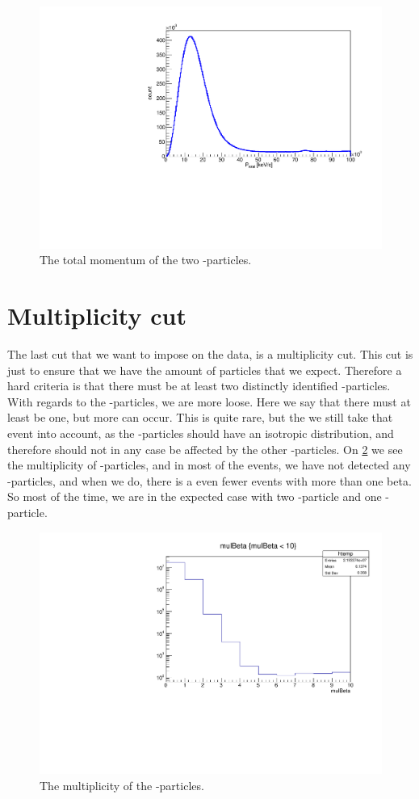 \begin{figure}[h]
	\centering
	\includegraphics[width=\linewidth]{../figures/ptotNoCut.pdf}
	\caption{The total momentum of the two \al-particles.}
	\label{fig:totalMomentum}
\end{figure}

\section{Multiplicity cut}
The last cut that we want to impose on the data, is a multiplicity cut. This cut is just to ensure that we have the amount of particles that we expect. 
Therefore a hard criteria is that there must be at least two distinctly identified \al-particles. \\

With regards to the \be-particles, we are more loose. Here we say that there must at least be one, but more can occur. This is quite rare, but the we still take that event into account, as the \be-particles should have an isotropic distribution, and therefore should not in any case be affected by the other \al-particles. On \cref{fig:mulBeta} we see the multiplicity of \be-particles, and in most of the events, we have not detected any \be-particles, and when we do, there is a even fewer events with more than one beta. So most of the time, we are in the expected case with two \al-particle and one \be-particle. 

\begin{figure}[h]
	\includegraphics[width=\linewidth]{../figures/mulBeta.pdf}
	\caption{The multiplicity of the \be-particles.}
	\label{fig:mulBeta}
\end{figure}